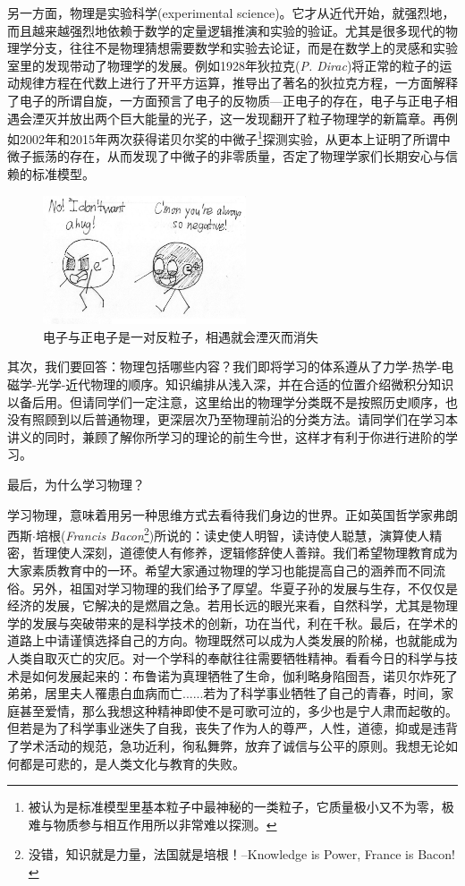 另一方面，物理是{\heiti 实验科学}(experimental science)。它才从近代开始，就强烈地，而且越来越强烈地依赖于数学的定量逻辑推演和实验的验证。尤其是很多现代的物理学分支，往往不是物理猜想需要数学和实验去论证，而是在数学上的灵感和实验室里的发现带动了物理学的发展。例如1928年狄拉克({\it P. Dirac})将正常的粒子的运动规律方程在代数上进行了开平方运算，推导出了著名的狄拉克方程，一方面解释了电子的所谓自旋，一方面预言了电子的反物质---正电子的存在，电子与正电子相遇会湮灭并放出两个巨大能量的光子，这一发现翻开了粒子物理学的新篇章。再例如2002年和2015年两次获得诺贝尔奖的中微子\footnote{被认为是标准模型里基本粒子中最神秘的一类粒子，它质量极小又不为零，极难与物质参与相互作用所以非常难以探测。}探测实验，从更本上证明了所谓中微子振荡的存在，从而发现了中微子的非零质量，否定了物理学家们长期安心与信赖的标准模型。

\begin{figure}
\begin{center}
\includegraphics[width = 6cm]{images/pre_4.pdf}
\caption{电子与正电子是一对反粒子，相遇就会湮灭而消失}
\end{center}
\end{figure}

其次，我们要回答：物理包括哪些内容？我们即将学习的体系遵从了力学-热学-电磁学-光学-近代物理的顺序。知识编排从浅入深，并在合适的位置介绍微积分知识以备后用。但请同学们一定注意，这里给出的物理学分类既不是按照历史顺序，也没有照顾到以后普通物理，更深层次乃至物理前沿的分类方法。请同学们在学习本讲义的同时，兼顾了解你所学习的理论的前生今世，这样才有利于你进行进阶的学习。

最后，为什么学习物理？

学习物理，意味着用另一种思维方式去看待我们身边的世界。正如英国哲学家弗朗西斯$\cdot$培根({\it Francis Bacon}\footnote{没错，知识就是力量，法国就是培根！--Knowledge is Power, France is Bacon!})所说的：读史使人明智，读诗使人聪慧，演算使人精密，哲理使人深刻，道德使人有修养，逻辑修辞使人善辩。我们希望物理教育成为大家素质教育中的一环。希望大家通过物理的学习也能提高自己的涵养而不同流俗。另外，祖国对学习物理的我们给予了厚望。华夏子孙的发展与生存，不仅仅是经济的发展，它解决的是燃眉之急。若用长远的眼光来看，自然科学，尤其是物理学的发展与突破带来的是科学技术的创新，功在当代，利在千秋。最后，在学术的道路上中请谨慎选择自己的方向。物理既然可以成为人类发展的阶梯，也就能成为人类自取灭亡的灾厄。对一个学科的奉献往往需要牺牲精神。看看今日的科学与技术是如何发展起来的：布鲁诺为真理牺牲了生命，伽利略身陷囹吾，诺贝尔炸死了弟弟，居里夫人罹患白血病而亡......若为了科学事业牺牲了自己的青春，时间，家庭甚至爱情，那么我想这种精神即使不是可歌可泣的，多少也是宁人肃而起敬的。但若是为了科学事业迷失了自我，丧失了作为人的尊严，人性，道德，抑或是违背了学术活动的规范，急功近利，徇私舞弊，放弃了诚信与公平的原则。我想无论如何都是可悲的，是人类文化与教育的失败。


